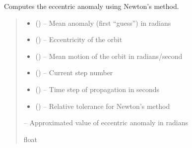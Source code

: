 \documentclass[letterpaper,10pt,english]{sphinxmanual}
\begin{document}
\begin{fulllineitems}
\label{\detokenize{fspsim.utils:fspsim.utils.Propagators.compute_eccentric_anomaly}}
\pysigstartsignatures
{}
\pysigstopsignatures
\sphinxAtStartPar
Computes the eccentric anomaly using Newton’s method.
\begin{quote}\begin{description}
\begin{itemize}
\item {} 
\sphinxAtStartPar
{} () – Mean anomaly (first “guess”) in radians

\item {} 
\sphinxAtStartPar
{} () – Eccentricity of the orbit

\item {} 
\sphinxAtStartPar
{} () – Mean motion of the orbit in radians/second

\item {} 
\sphinxAtStartPar
{} () – Current step number

\item {} 
\sphinxAtStartPar
{} () – Time step of propagation in seconds

\item {} 
\sphinxAtStartPar
{} () – Relative tolerance for Newton’s method

\end{itemize}

\sphinxAtStartPar
{} – Approximated value of eccentric anomaly in radians

\sphinxAtStartPar
float

\end{description}\end{quote}

\end{fulllineitems}
\end{document}
